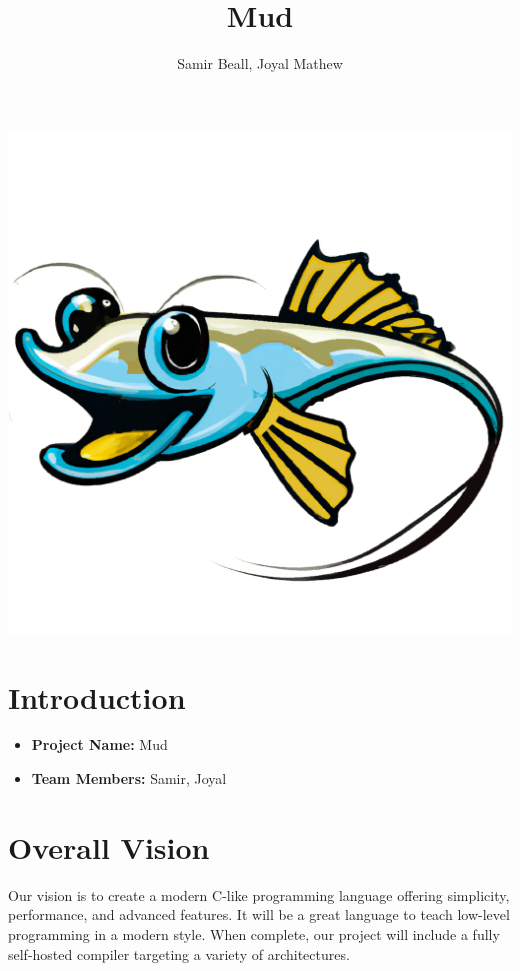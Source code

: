 \documentclass{article}
\title{Mud}
\author{Samir Beall, Joyal Mathew}
\begin{document}
\begin{center}
  \includegraphics[scale=0.125]{mudfish}
\end{center}

{
  \let \newpage \relax
  \maketitle
}

\section*{Introduction}

\begin{itemize}
\item
  \textbf{Project Name:} Mud
\item
  \textbf{Team Members:} Samir, Joyal
\end{itemize}

\section*{Overall Vision}

Our vision is to create a modern C-like programming language offering simplicity, performance, and advanced features. It will be a great language to teach low-level programming in a modern style. When complete, our project will include a fully self-hosted compiler targeting a variety of architectures.
\end{document}
